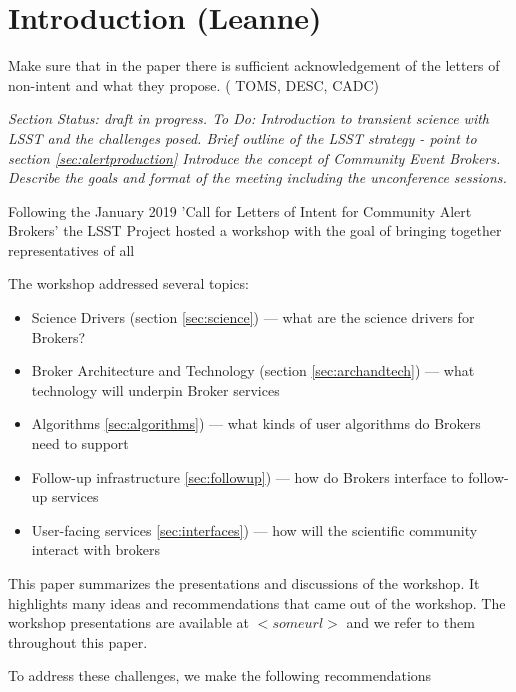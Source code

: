 \section{Introduction (Leanne)} \label{sec:intro}

Make sure that in the paper there is sufficient acknowledgement of the letters of non-intent and what they propose.  ( {TOMS},  {DESC},  {CADC})


{\it Section Status: draft in progress. 
To Do: 
Introduction to  {transient} science with   LSST  and the challenges posed.  
Brief outline of the   LSST  strategy - point to section \ref{sec:alertproduction}
Introduce the concept of Community Event Brokers.   
Describe the goals and format of the meeting including the unconference sessions. }

Following the January 2019 'Call for Letters of Intent for Community   Alert  Brokers'  
\citep{LDM-612}
the   LSST  Project hosted a workshop with the goal of bringing together representatives of all 

The workshop addressed several topics: 
\begin{itemize}
    \item Science Drivers (section \ref{sec:science}) --- what are the science drivers for Brokers?
    \item  {Broker} Architecture and Technology (section \ref{sec:archandtech}) --- what technology will underpin  {Broker} services 
    \item Algorithms \ref{sec:algorithms}) ---  what kinds of user algorithms do Brokers need to support 
    \item Follow-up infrastructure \ref{sec:followup}) --- how do Brokers interface to follow-up services 
    \item User-facing services \ref{sec:interfaces}) --- how will the scientific community interact with brokers 
\end{itemize}

This paper summarizes the presentations and discussions of the workshop. It highlights many ideas and recommendations that came out of the workshop. The workshop presentations are available at $<someurl>$ and we refer to them throughout this paper.


To address these challenges, we make the following recommendations

